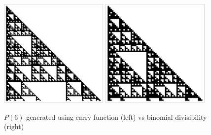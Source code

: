 \documentclass{beamer}
\begin{document}
\begin{frame}
    \begin{figure}
        \includegraphics[width=0.475\textwidth]{Mod6CP.pdf}
        \hfill
        \includegraphics[width=0.475\textwidth]{Mod6.pdf}
        \caption{$P(6)$ generated using carry function (left) vs binomial divisibility (right)}
    \end{figure}
        
\end{frame}
\end{document}
